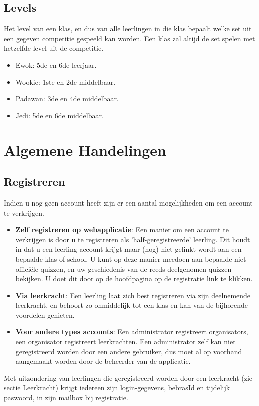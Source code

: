 \documentclass[11pt,a4paper]{report}
\begin{document}
\subsection{Levels}
Het level van een klas, en dus van alle leerlingen in die klas bepaalt welke set uit een gegeven competitie gespeeld kan worden. Een klas zal altijd de set spelen met hetzelfde level uit de competitie.
\begin{itemize}
\item Ewok: 5de en 6de leerjaar.
\item Wookie: 1ste en 2de middelbaar.
\item Padawan: 3de en 4de middelbaar.
\item Jedi: 5de en 6de middelbaar.
\end{itemize}



\section{Algemene Handelingen}

\subsection{Registreren}
Indien u nog geen account heeft zijn er een aantal mogelijkheden om een account te verkrijgen. 
\begin{itemize}
\item \textbf {Zelf registreren op webapplicatie}: Een manier om een account te verkrijgen is door u te registreren als 'half-geregistreerde' leerling.  Dit houdt in dat u een leerling-account krijgt maar (nog) niet gelinkt wordt aan een bepaalde klas of school. U kunt op deze manier meedoen aan bepaalde niet offici\"ele quizzen, en uw geschiedenis van de reeds deelgenomen quizzen bekijken. U doet dit door op de hoofdpagina op de registratie link te klikken.
\item \textbf{Via leerkracht}: Een leerling laat zich best registreren via zijn deelnemende leerkracht, en behoort zo onmiddelijk tot een klas en kan van de bijhorende voordelen genieten.
\item \textbf{Voor andere types accounts}: Een administrator registreert organisators, een organisator registreert leerkrachten. Een administrator zelf kan niet geregistreerd worden door een andere gebruiker, dus moet al op voorhand aangemaakt worden door de beheerder van de applicatie. 
\end{itemize}
Met uitzondering van leerlingen die geregistreerd worden door een leerkracht (zie sectie Leerkracht) krijgt iedereen zijn login-gegevens, bebrasId en tijdelijk paswoord, in zijn mailbox bij registratie. 
\end{document}
